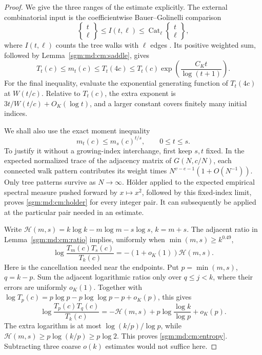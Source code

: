 \documentclass[11pt,letterpaper]{article}
\theoremstyle{remark}\newtheorem{remark}[theorem]{Remark}
\newcommand{\Cat}{\operatorname{Cat}}\newcommand{\E}{\mathbb E}\newcommand{\Prob}{\mathbb P}\newcommand{\ind}{\mathbf 1}
\theoremstyle{definition}\newtheorem{definition}[theorem]{Definition}
\begin{document}
\begin{proof}
We give the three ranges of the estimate explicitly.
The external combinatorial input is the coefficientwise
Bauer--Golinelli comparison
\[
 \left\{\begin{matrix}t\\\ell\end{matrix}\right\}
 \le I(t,\ell)\le
 \Cat_\ell\left\{\begin{matrix}t\\\ell\end{matrix}\right\},
\]
where \(I(t,\ell)\) counts the tree walks with \(\ell\) edges
\cite{bg}.
Its positive weighted sum, followed by
Lemma~\ref{sgm:md:cm:saddle}, gives
\begin{equation}\label{sgm:md:cm:envelope}
 T_t(c)\le m_t(c)\le T_t(4c)
 \le T_t(c)\exp\left(\frac{C_Kt}{\log(t+1)}\right).
\end{equation}
For the final inequality, evaluate the exponential generating function
of \(T_t(4c)\) at \(W(t/c)\). Relative to \(T_t(c)\), the extra
exponent is \(3t/W(t/c)+O_K(\log t)\), and a larger constant covers
finitely many initial indices.

We shall also use the exact moment inequality
\begin{equation}\label{sgm:md:cm:holder}
 m_t(c)\le m_s(c)^{t/s},\qquad 0\le t\le s.
\end{equation}
To justify it without a growing-index interchange, first keep \(s,t\)
fixed. In the expected normalized trace of the adjacency matrix of
\(G(N,c/N)\), each connected walk pattern contributes its weight times
\(N^{v-e-1}(1+O(N^{-1}))\). Only tree patterns survive as \(N\to\infty\).
H\"older applied to the expected empirical spectral measure pushed
forward by \(x\mapsto x^2\), followed by this fixed-index limit, proves
\eqref{sgm:md:cm:holder} for every integer pair. It can subsequently be
applied at the particular pair needed in an estimate.

Write
\(\mathcal H(m,s)=k\log k-m\log m-s\log s\), \(k=m+s\).
The adjacent ratio in Lemma~\ref{sgm:md:cm:ratio} implies, uniformly when
\(\min(m,s)\ge k^{0.49}\),
\begin{equation}\label{sgm:md:cm:entropy}
 \log\frac{T_m(c)T_s(c)}{T_k(c)}
 =-(1+o_K(1))\mathcal H(m,s).
\end{equation}
Here is the cancellation needed near the endpoints. Put
\(p=\min(m,s)\), \(q=k-p\). Sum the adjacent logarithmic ratios
only over \(q\le j<k\), where their errors are uniformly \(o_K(1)\).
Together with
\(\log T_p(c)=p\log p-p\log\log p-p+o_K(p)\), this gives
\[
 \log\frac{T_p(c)T_q(c)}{T_k(c)}
 =-\mathcal H(m,s)+
   p\log\frac{\log k}{\log p}+o_K(p).
\]
The extra logarithm is at most \(\log(k/p)/\log p\), while
\(\mathcal H(m,s)\ge p\log(k/p)\ge p\log2\).
This proves \eqref{sgm:md:cm:entropy}. Subtracting three coarse
\(o(k)\) estimates would not suffice here.


\end{proof}
\end{document}
